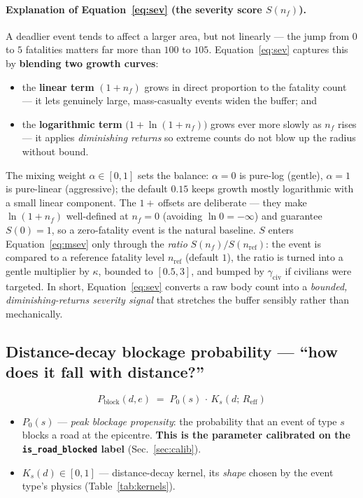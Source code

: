 \documentclass[11pt,a4paper]{article}
\newcommand{\code}[1]{\texttt{\small #1}}
\newcommand{\Reff}{R_{\mathrm{eff}}}
\newcommand{\Pblock}{P_{\mathrm{block}}}
\begin{document}
\paragraph{Explanation of Equation~\eqref{eq:sev} (the severity score $S(n_f)$).}
A deadlier event tends to affect a larger area, but not linearly --- the jump from $0$ to $5$
fatalities matters far more than $100$ to $105$. Equation~\eqref{eq:sev} captures this by
\textbf{blending two growth curves}:
\begin{itemize}[nosep,leftmargin=1.4em]
  \item the \textbf{linear term} $(1+n_f)$ grows in direct proportion to the fatality count ---
        it lets genuinely large, mass-casualty events widen the buffer; and
  \item the \textbf{logarithmic term} $\bigl(1+\ln(1+n_f)\bigr)$ grows ever more slowly as $n_f$
        rises --- it applies \emph{diminishing returns} so extreme counts do not blow up the
        radius without bound.
\end{itemize}
The mixing weight $\alpha\in[0,1]$ sets the balance: $\alpha=0$ is pure-log (gentle), $\alpha=1$
is pure-linear (aggressive); the default $0.15$ keeps growth mostly logarithmic with a small
linear component. The $1+\,$offsets are deliberate --- they make $\ln(1+n_f)$ well-defined at
$n_f=0$ (avoiding $\ln 0=-\infty$) and guarantee $S(0)=1$, so a zero-fatality event is the
natural baseline. $S$ enters Equation~\eqref{eq:msev} only through the \emph{ratio}
$S(n_f)/S(n_{\mathrm{ref}})$: the event is compared to a reference fatality level
$n_{\mathrm{ref}}$ (default $1$), the ratio is turned into a gentle multiplier by $\kappa$,
bounded to $[0.5,3]$, and bumped by $\gamma_{\mathrm{civ}}$ if civilians were targeted. In
short, Equation~\eqref{eq:sev} converts a raw body count into a \emph{bounded,
diminishing-returns severity signal} that stretches the buffer sensibly rather than mechanically.

\subsection{Distance-decay blockage probability --- ``how does it fall with distance?''}

\begin{equation}
\Pblock(d,e) \;=\; P_0(s)\,\cdot\,K_s\!\left(d;\,\Reff\right)
\label{eq:pblock}
\end{equation}

\begin{itemize}[nosep,leftmargin=1.4em]
  \item $P_0(s)$ --- \emph{peak blockage propensity}: the probability that an event of type $s$
        blocks a road at the epicentre. \textbf{This is the parameter calibrated on the
        \code{is\_road\_blocked} label} (Sec.~\ref{sec:calib}).
  \item $K_s(d)\in[0,1]$ --- distance-decay kernel, its \emph{shape} chosen by the event
        type's physics (Table~\ref{tab:kernels}).
\end{itemize}
\end{document}

